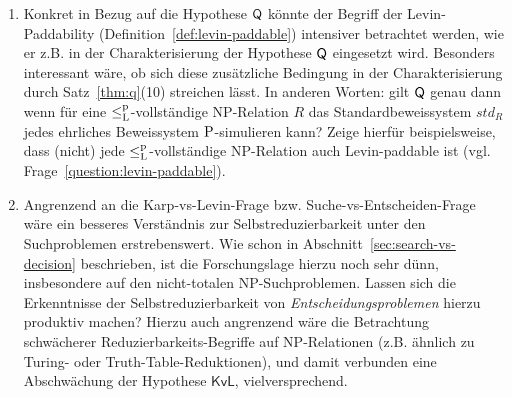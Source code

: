 \begin{enumerate}[label=\arabic*.,midpenalty=0]
    \item Konkret in Bezug auf die Hypothese $\hQ$ könnte der Begriff der Levin-Paddability (Definition~\ref{def:levin-paddable}) intensiver betrachtet werden, wie er z.B. in der Charakterisierung der Hypothese $\hQ$ eingesetzt wird. Besonders interessant wäre, ob sich diese zusätzliche Bedingung in der Charakterisierung durch Satz~\ref{thm:q}(10) streichen lässt. In anderen Worten: gilt $\hQ$ genau dann wenn für eine $\leqlp$-vollständige NP-Relation $R$ das Standardbeweissystem $\mathit{std}_R$ jedes ehrliches Beweissystem $\P$-simulieren kann?
        Zeige hierfür beispielsweise, dass (nicht) jede $\leqlp$-vollständige NP-Relation auch Levin-paddable ist (vgl. Frage~\ref{question:levin-paddable}). 
    \item Angrenzend an die Karp-vs-Levin-Frage bzw. Suche-vs-Entscheiden-Frage wäre ein besseres Verständnis zur Selbstreduzierbarkeit unter den Suchproblemen erstrebenswert. Wie schon in Abschnitt~\ref{sec:search-vs-decision} beschrieben, ist die Forschungslage hierzu noch sehr dünn, insbesondere auf den nicht-totalen NP-Suchproblemen. Lassen sich die Erkenntnisse der Selbstreduzierbarkeit von \emph{Entscheidungsproblemen} hierzu produktiv machen? Hierzu auch angrenzend wäre die Betrachtung schwächerer Reduzierbarkeits-Begriffe auf NP-Relationen (z.B. ähnlich zu Turing- oder Truth-Table-Reduktionen), und damit verbunden eine Abschwächung der Hypothese $\mathsf{KvL}$, vielversprechend.
\end{enumerate}
